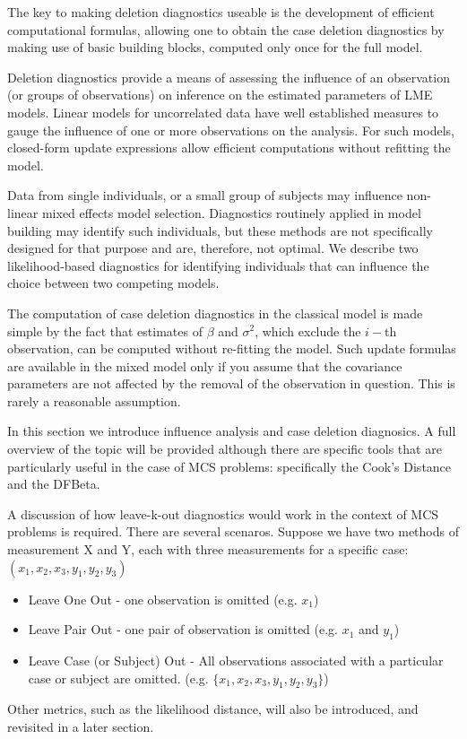 \documentclass[12pt, a4paper]{report}
\theoremstyle{plain}
\theoremstyle{definition}
\theoremstyle{remark}
\begin{document}
	
	The key to making deletion diagnostics useable is the development of efficient computational formulas, allowing one to obtain the  case deletion diagnostics by making use of basic building blocks, computed only once for the full model.
	
	Deletion diagnostics provide a means of assessing the influence of an observation (or groups of observations) on inference on the estimated parameters of LME models. Linear models for uncorrelated data have well established measures to gauge the influence of one or more observations on the analysis. For such models, closed-form update expressions allow efficient computations without refitting the model.
	
	Data from single individuals, or a small group of subjects may influence non-linear mixed effects model selection. Diagnostics routinely applied in model building may identify such individuals, but these methods are not specifically designed for that purpose and are, therefore, not optimal. We describe two likelihood-based diagnostics for identifying individuals that can influence the choice between two competing models.
	
	
	The computation of case deletion diagnostics in the classical model is made simple by the fact that estimates of $\beta$ and $\sigma^2$, which exclude the $i-$th observation, can be computed without re-fitting the model. Such update formulas are available in the mixed model only if you assume that the covariance parameters are not affected by the removal of the observation in question. This is rarely a reasonable assumption.
	
	
	In this section we introduce influence analysis and case deletion diagnosics. A full overview of the topic will be provided although there are specific tools that are particularly useful in the case of MCS problems: specifically the Cook's Distance and the DFBeta.
	
	A discussion of how leave-k-out diagnostics would work in the context of MCS problems is required. There are several scenaros. Suppose we have two methods of measurement X and Y, each with three measurements for a specific case: $(x_1,x_2,x_3,y_1,y_2,y_3)$
	
	\begin{itemize}
		\item Leave One Out - one observation is omitted (e.g. $x_1$)
		\item Leave Pair Out - one pair of observation  is omitted (e.g. $x_1$ and $y_1$)
		\item Leave Case (or Subject) Out - All observations associated with a particular case or subject are omitted. (e.g. $\{x_1,x_2,x_3,y_1,y_2,y_3\}$)
	\end{itemize}
	Other metrics, such as the likelihood distance, will also be introduced, and revisited in a later section.
	
\end{document}
